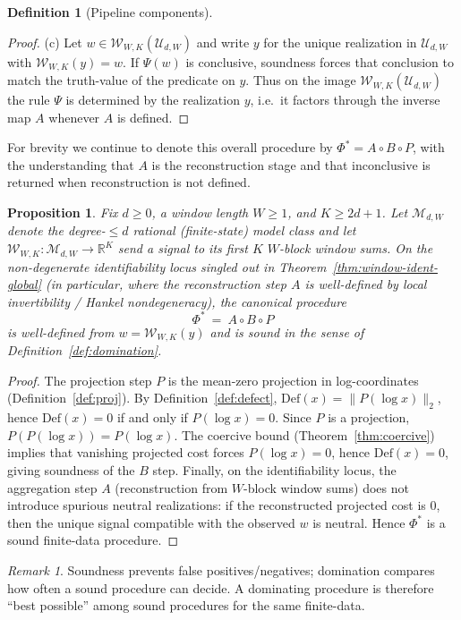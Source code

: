 \documentclass[11pt,reqno]{amsart}
\newtheorem{proposition}[theorem]{Proposition}
\theoremstyle{definition}
\newtheorem{definition}[theorem]{Definition}
\theoremstyle{remark}
\newtheorem{remark}[theorem]{Remark} %
\newcommand{\R}{\mathbb{R}}
\newcommand{\1}{\mathbf{1}}
\newcommand{\inconclusive}{\mathrm{inconclusive}}
\begin{document}
\begin{definition}[Pipeline components]
\begin{proof}
(c) Let $w\in\mathcal W_{W,K}(\mathcal U_{d,W})$ and write $y$ for the unique realization in $\mathcal U_{d,W}$ with $\mathcal W_{W,K}(y)=w$.
If $\Psi(w)$ is conclusive, soundness forces that conclusion to match the truth-value of the predicate on $y$.
Thus on the image $\mathcal W_{W,K}(\mathcal U_{d,W})$ the rule $\Psi$ is determined by the realization $y$, i.e.\ it factors through the inverse map $A$ whenever $A$ is defined.
\end{proof}


For brevity we continue to denote this overall procedure by $\Phi^\ast=A\circ B\circ P$, with the understanding that $A$ is the reconstruction stage and that $\inconclusive$ is returned when reconstruction is not defined.
\end{definition}

\begin{proposition}\label{prop:pipeline-sound}
Fix $d\ge 0$, a window length $W\ge 1$, and $K\ge 2d+1$. Let $\mathcal M_{d,W}$ denote the degree-$\le d$
rational (finite-state) model class and let $\mathcal W_{W,K}:\mathcal M_{d,W}\to\R^K$ send a signal to its
first $K$ $W$-block window sums. On the non-degenerate identifiability locus singled out in
Theorem~\ref{thm:window-ident-global} (in particular, where the reconstruction step $A$ is well-defined by local invertibility / Hankel nondegeneracy), the canonical procedure
\[
\Phi^\ast \:=\ A\circ B\circ P
\]
is well-defined from $w=\mathcal W_{W,K}(y)$ and is sound in the sense of Definition~\ref{def:domination}.
\end{proposition}

\begin{proof}
The projection step $P$ is the mean-zero projection in log-coordinates (Definition~\ref{def:proj}).
By Definition~\ref{def:defect}, $\mathrm{Def}(x)=\|P(\log x)\|_2$, hence $\mathrm{Def}(x)=0$ if and only if $P(\log x)=0$.
Since $P$ is a projection, $P(P(\log x))=P(\log x)$. The coercive bound (Theorem~\ref{thm:coercive})
implies that vanishing projected cost forces $P(\log x)=0$, hence $\mathrm{Def}(x)=0$, giving soundness of the $B$ step.
Finally, on the identifiability locus, the aggregation step $A$ (reconstruction from $W$-block window sums)
does not introduce spurious neutral realizations: if the reconstructed projected cost is $0$, then the unique
signal compatible with the observed $w$ is neutral. Hence $\Phi^\ast$ is a sound finite-data procedure.
\end{proof}

\begin{remark}\label{rem:domination-intuition}
Soundness prevents false positives/negatives; domination compares how often a sound procedure can decide.
A dominating procedure is therefore ``best possible'' among sound procedures for the same finite-data.
\end{remark}
\end{document}
